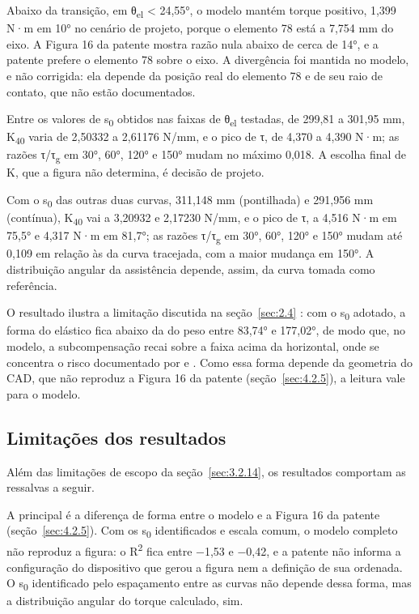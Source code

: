 Abaixo da transição, em θ\textsubscript{el} < 24,55°, o modelo mantém torque positivo, 1,399 N·m em 10° no cenário de projeto, porque o elemento 78 está a 7,754 mm do eixo. A Figura 16 da patente mostra razão nula abaixo de cerca de 14°, e a patente prefere o elemento 78 sobre o eixo. A divergência foi mantida no modelo, e não corrigida: ela depende da posição real do elemento 78 e de seu raio de contato, que não estão documentados.

Entre os valores de s\textsubscript{0} obtidos nas faixas de θ\textsubscript{el} testadas, de 299,81 a 301,95 mm, K\textsubscript{40} varia de 2,50332 a 2,61176 N/mm, e o pico de τ, de 4,370 a 4,390 N·m; as razões τ/τ\textsubscript{g} em 30°, 60°, 120° e 150° mudam no máximo 0,018. A escolha final de K, que a figura não determina, é decisão de projeto.

Com o s\textsubscript{0} das outras duas curvas, 311,148 mm (pontilhada) e 291,956 mm (contínua), K\textsubscript{40} vai a 3,20932 e 2,17230 N/mm, e o pico de τ, a 4,516 N·m em 75,5° e 4,317 N·m em 81,7°; as razões τ/τ\textsubscript{g} em 30°, 60°, 120° e 150° mudam até 0,109 em relação às da curva tracejada, com a maior mudança em 150°. A distribuição angular da assistência depende, assim, da curva tomada como referência.

O resultado ilustra a limitação discutida na seção~\ref{sec:2.4} \cite{nasr2022}: com o s\textsubscript{0} adotado, a forma do elástico fica abaixo da do peso entre 83,74° e 177,02°, de modo que, no modelo, a subcompensação recai sobre a faixa acima da horizontal, onde se concentra o risco documentado por \textcite{vandermolen2017} e \textcite{seidler2020}. Como essa forma depende da geometria do CAD, que não reproduz a Figura 16 da patente (seção~\ref{sec:4.2.5}), a leitura vale para o modelo.

\subsection{Limitações dos resultados}\label{sec:4.2.10}

Além das limitações de escopo da seção~\ref{sec:3.2.14}, os resultados comportam as ressalvas a seguir.

A principal é a diferença de forma entre o modelo e a Figura 16 da patente (seção~\ref{sec:4.2.5}). Com os s\textsubscript{0} identificados e escala comum, o modelo completo não reproduz a figura: o R\textsuperscript{2} fica entre −1,53 e −0,42, e a patente não informa a configuração do dispositivo que gerou a figura nem a definição de sua ordenada. O s\textsubscript{0} identificado pelo espaçamento entre as curvas não depende dessa forma, mas a distribuição angular do torque calculado, sim.

